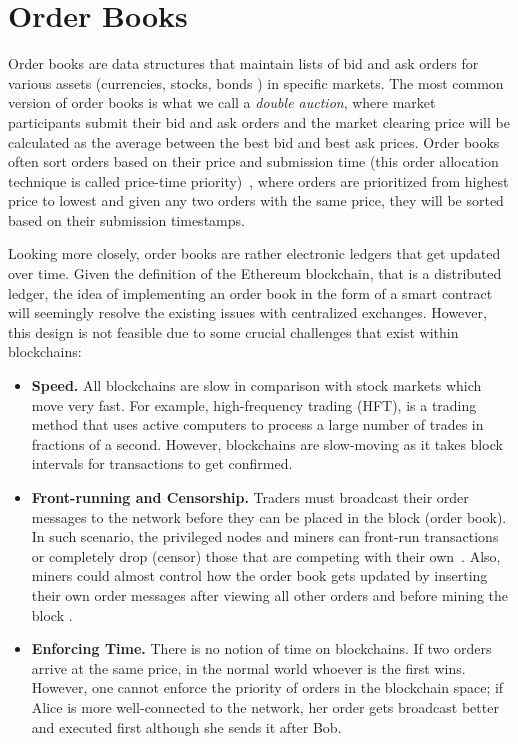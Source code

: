 \section{Order Books}

Order books are data structures that maintain lists of bid and ask orders for various assets (\eg currencies, stocks, bonds \etc) in specific markets. The most common version of order books is what we call a \textit{double auction}, where market participants submit their bid and ask orders and the market clearing price will be calculated as the average between the best bid and best ask prices. Order books often sort orders based on their price and submission time (this order allocation technique is called price-time priority)~\cite{preis2011price}, where orders are prioritized from highest price to lowest and given any two orders with the same price, they will be sorted based on their submission timestamps.

Looking more closely, order books are rather electronic ledgers that get updated over time. Given the definition of the Ethereum blockchain, that is a distributed ledger, the idea of implementing an order book in the form of a smart contract will seemingly resolve the existing issues with centralized exchanges. However, this design is not feasible due to some crucial challenges that exist within blockchains:

\begin{itemize}
\item \textbf{Speed.} All blockchains are slow in comparison with stock markets which move very fast. For example, high-frequency trading (HFT), is a trading method that uses active computers to process a large number of trades in fractions of a second. However, blockchains are slow-moving as it takes block intervals for transactions to get confirmed.


\item \textbf{Front-running and Censorship.} Traders must broadcast their order messages to the network before they can be placed in the block (\ie order book). In such scenario, the privileged nodes and miners can front-run transactions or completely drop (censor) those that are competing with their own~\cite{eskandari2019sok}. Also, miners could almost control how the order book gets updated by inserting their own order messages after viewing all other orders and before mining the block .



\item \textbf{Enforcing Time.} There is no notion of time on blockchains. If two orders arrive at the same price, in the normal world whoever is the first wins. However, one cannot enforce the priority of orders in the blockchain space; if Alice is more well-connected to the network, her order gets broadcast better and executed first although she sends it after Bob. 

\end{itemize}


